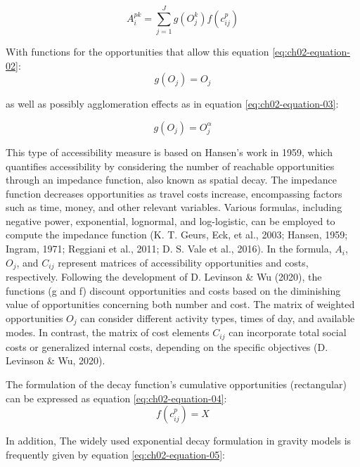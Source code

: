 \documentclass[
11pt, %
oneside, %
english, %
singlespacing, %
]{macthesis} %
\begin{document}
\begin{equation}
A^{pk}_i = \sum _{j=1} ^ {J} g(O^ k_{j}) f(c^p_{ij})
\label{eq:ch02-equation-01}
\end{equation}

With functions for the opportunities that allow this equation \ref{eq:ch02-equation-02}:
\begin{equation}
g(O_j) = O_j
\label{eq:ch02-equation-02}
\end{equation}

\noindent as well as possibly agglomeration effects as in equation \ref{eq:ch02-equation-03}:

\begin{equation}
g(O_j) = O^\alpha_j
\label{eq:ch02-equation-03}
\end{equation}

This type of accessibility measure is based on Hansen's work in 1959, which quantifies accessibility by considering the number of reachable opportunities through an impedance function, also known as spatial decay. The impedance function decreases opportunities as travel costs increase, encompassing factors such as time, money, and other relevant variables. Various formulas, including negative power, exponential, lognormal, and log-logistic, can be employed to compute the impedance function (K. T. Geurs, Eck, et al., 2003; Hansen, 1959; Ingram, 1971; Reggiani et al., 2011; D. S. Vale et al., 2016). In the formula, \(A_i\), \(O_j\), and \(C_{ij}\) represent matrices of accessibility opportunities and costs, respectively. Following the development of D. Levinson \& Wu (2020), the functions (g and f) discount opportunities and costs based on the diminishing value of opportunities concerning both number and cost. The matrix of weighted opportunities \(O_j\) can consider different activity types, times of day, and available modes. In contrast, the matrix of cost elements \(C_{ij}\) can incorporate total social costs or generalized internal costs, depending on the specific objectives (D. Levinson \& Wu, 2020).

The formulation of the decay function's cumulative opportunities (rectangular) can be expressed as equation \ref{eq:ch02-equation-04}:
\begin{equation}
f(c^p_{ij}) = X
\label{eq:ch02-equation-04}
\end{equation}

In addition, The widely used exponential decay formulation in gravity models is frequently given by equation \ref{eq:ch02-equation-05}:
\end{document}
